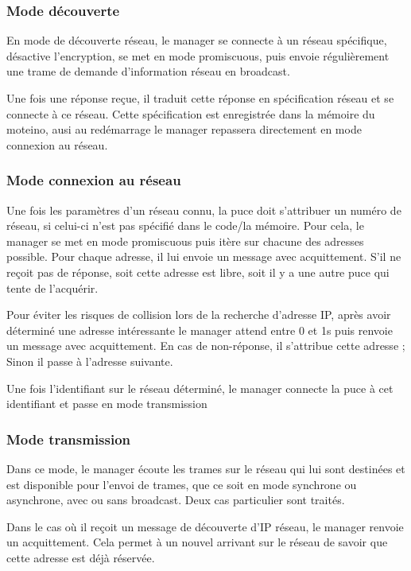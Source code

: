 \documentclass{report}
\begin{document}
\subsubsection{Mode découverte}

En mode de découverte réseau, le manager se connecte à un réseau spécifique, désactive l'encryption, se met en mode promiscuous, puis envoie régulièrement une trame de demande d'information réseau en broadcast.

Une fois une réponse reçue, il traduit cette réponse en spécification réseau et se connecte à ce réseau. Cette spécification est enregistrée dans la mémoire du moteino, ausi au redémarrage le manager repassera directement en mode connexion au réseau.

\subsubsection{Mode connexion au réseau}

Une fois les paramètres d'un réseau connu, la puce doit s'attribuer un numéro de réseau, si celui-ci n'est pas spécifié dans le code/la mémoire. Pour cela, le manager se met en mode promiscuous puis itère sur chacune des adresses possible. Pour chaque adresse, il lui envoie un message avec acquittement. S'il ne reçoit pas de réponse, soit cette adresse est libre, soit il y a une autre puce qui tente de l'acquérir.

Pour éviter les risques de collision lors de la recherche d'adresse IP, après avoir déterminé une adresse intéressante le manager attend entre 0 et 1s puis renvoie un message avec acquittement. En cas de non-réponse, il s'attribue cette adresse ; Sinon il passe à l'adresse suivante.

Une fois l'identifiant sur le réseau déterminé,  le manager connecte la puce à cet identifiant et passe en mode transmission

\subsubsection{Mode transmission}

Dans ce mode, le manager écoute les trames sur le réseau qui lui sont destinées et est disponible pour l'envoi de trames, que ce soit en mode synchrone ou asynchrone, avec ou sans broadcast. Deux cas particulier sont traités.

Dans le cas où il reçoit un message de découverte d'IP réseau, le manager renvoie un acquittement. Cela permet à un nouvel arrivant sur le réseau de savoir que cette adresse est déjà réservée.
\end{document}
